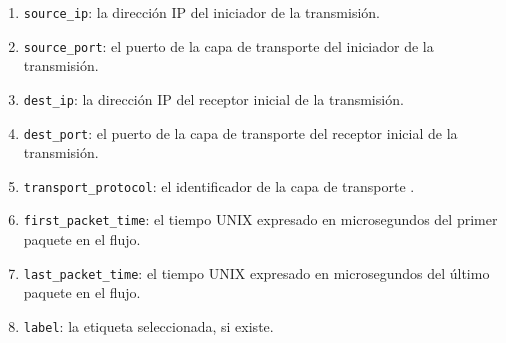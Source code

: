 \begin{enumerate}
  \item \texttt{source\_ip}: la dirección IP del iniciador de la transmisión.
  \item \texttt{source\_port}: el puerto de la capa de transporte del iniciador de la transmisión.
  \item \texttt{dest\_ip}: la dirección IP del receptor inicial de la transmisión.
  \item \texttt{dest\_port}: el puerto de la capa de transporte del receptor inicial de la transmisión.
  \item \texttt{transport\_protocol}: el identificador de la capa de transporte \cite{ipprotocolnumbers}.
  \item \texttt{first\_packet\_time}: el tiempo UNIX expresado en microsegundos del primer paquete en el flujo.
  \item \texttt{last\_packet\_time}:  el tiempo UNIX expresado en microsegundos del último paquete en el flujo.
  \item \texttt{label}: la etiqueta seleccionada, si existe.
\end{enumerate}

